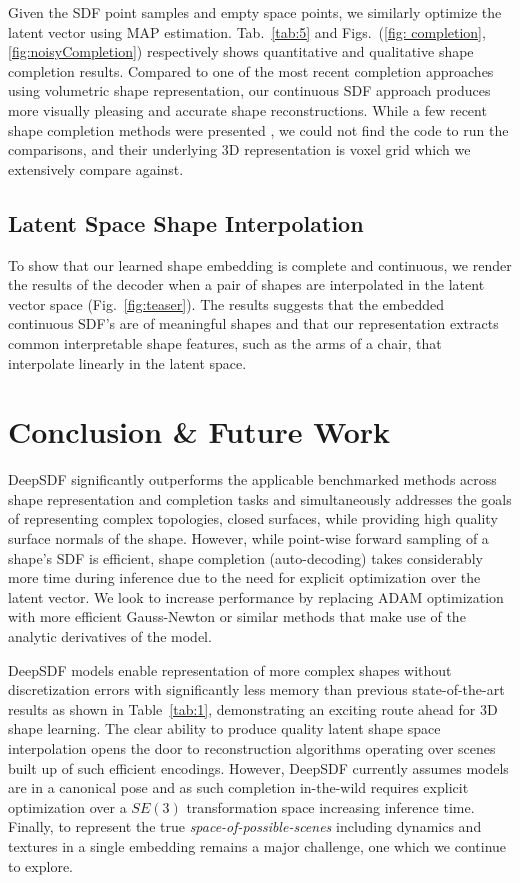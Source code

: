 \documentclass[10pt,twocolumn,letterpaper]{article}
\begin{document}
Given the SDF point samples and empty space points, we similarly optimize the latent vector using MAP estimation. Tab.~\ref{tab:5} and Figs.~(\ref{fig: completion}, \ref{fig:noisyCompletion}) respectively shows quantitative and qualitative shape completion results. Compared to one of the most recent completion approaches \cite{dai2017shape} using volumetric shape representation, our continuous SDF approach produces more visually pleasing and accurate shape reconstructions. While a few recent shape completion methods were presented \cite{han2017high, wu2018learning}, we could not find the code to run the comparisons, and their underlying 3D representation is voxel grid which we extensively compare against. 

\subsection{Latent Space Shape Interpolation \label{sec: interp}}
To show that our learned shape embedding is complete and continuous, we render the results of the decoder when a pair of shapes are interpolated in the latent vector space (Fig.~\ref{fig:teaser}). The results suggests that the embedded continuous SDF's are of meaningful shapes and that our representation extracts common interpretable shape features, such as the arms of a chair, that interpolate linearly in the latent space.

\section{Conclusion \& Future Work}

DeepSDF significantly outperforms the applicable benchmarked methods across shape representation and completion tasks and simultaneously addresses the goals of representing complex topologies, closed surfaces, while providing high quality surface normals of the shape. However, while point-wise forward sampling of a shape's SDF is efficient, shape completion (auto-decoding) takes considerably more time during inference due to the need for explicit optimization over the latent vector. We look to increase performance by replacing ADAM optimization with more efficient Gauss-Newton or similar methods that make use of the analytic derivatives of the model.

DeepSDF models enable representation of more complex shapes without discretization errors with significantly less memory than previous state-of-the-art results as shown in Table~\ref{tab:1},  demonstrating an exciting route ahead for 3D shape learning. The clear ability to produce quality latent shape space interpolation opens the door to reconstruction algorithms operating over scenes built up of such efficient encodings. However, DeepSDF currently assumes models are in a canonical pose and as such completion in-the-wild requires explicit optimization over a $SE(3)$ transformation space increasing inference time. Finally, to represent the true \textit{space-of-possible-scenes} including dynamics and textures in a single embedding remains a major challenge, one which we continue to explore.
\end{document}
